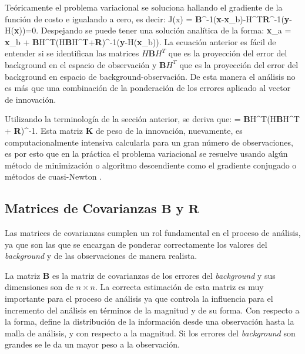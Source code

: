 Teóricamente el problema variacional se soluciona hallando el gradiente de la función de costo e igualando a cero, es decir:
\be 
\nabla J(x) = \textbf{B}^{-1}(\textbf{x}-\textbf{x}_b)-H^T\textbf{R}^{-1}(\textbf{y}-H(\textbf{x}))=0.
\ee
Despejando se puede tener una solución analítica de la forma:
\be \label{eq:03_dataassim}
\textbf{x}_a = \textbf{x}_b + \textbf{B}H^T(H\textbf{B}H^T+\textbf{R})^{-1}(\textbf{y}-H(\textbf{x}_b)). 
\ee
La ecuación anterior es fácil de entender si se identifican las matrices $H\textbf{B}H^T$ que es la proyección del error del background en el espacio de observación y $\textbf{B}H^T$ que es la proyección del error del background en espacio de background-observación. De esta manera el análisis no es más que una combinación de la ponderación de los errores aplicado al vector de innovación.

Utilizando la terminología de la sección anterior, se deriva que:
\be
{} = \textbf{B}H^{T}(H\textbf{B}H^T + \textbf{R})^{-1}.
\ee 
Esta matriz $\textbf{K}$ de peso de la innovación, nuevamente, es computacionalmente intensiva calcularla para un gran número de observaciones, es por esto que en la práctica el problema variacional se resuelve usando algún método de minimización o algoritmo descendiente como el gradiente conjugado o métodos de cuasi-Newton \citep{burden2010numerical}.
\subsection{Matrices de Covarianzas $\textbf{B}$ y $\textbf{R}$}
Las matrices de covarianzas cumplen un rol fundamental en el proceso de análisis, ya que son las que se encargan de ponderar correctamente los valores del \emph{background} y de las observaciones de manera realista. 

La matriz $\textbf{B}$ es la matriz de covarianzas de los errores del \emph{background} y sus dimensiones son de $n\times n$. La correcta estimación de esta matriz es muy importante para el proceso de análisis ya que  controla la influencia para el incremento del análisis en términos de la magnitud y de su forma. Con respecto a la forma, define la distribución de la información desde una observación hasta la malla de análisis, y con respecto a la magnitud. Si los errores del \emph{background} son grandes se le da un mayor peso a la observación.

